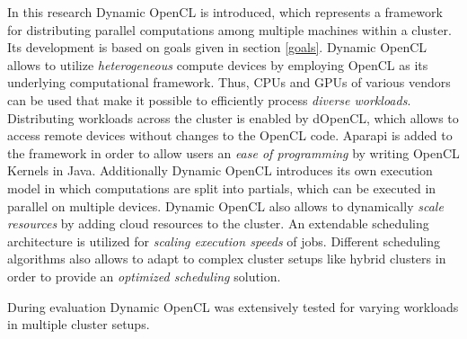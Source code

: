 In this research Dynamic OpenCL is introduced, which represents a framework for distributing parallel computations among multiple machines within a cluster. Its development is based on goals given in section \ref{goals}. Dynamic OpenCL allows to utilize \textit{heterogeneous} compute devices by employing OpenCL as its underlying computational framework. Thus, CPUs and GPUs of various vendors can be used that make it possible to efficiently process \textit{diverse workloads}. Distributing workloads across the cluster is enabled by dOpenCL, which allows to access remote devices without changes to the OpenCL code. Aparapi is added to the framework in order to allow users an \textit{ease of programming} by writing OpenCL Kernels in Java. Additionally Dynamic OpenCL introduces its own execution model in which computations are split into partials, which can be executed in parallel on multiple devices. Dynamic OpenCL also allows to dynamically \textit{scale resources} by adding cloud resources to the cluster. An extendable scheduling architecture is utilized for \textit{scaling execution speeds} of jobs. Different scheduling algorithms also allows to adapt to complex cluster setups like hybrid clusters in order to provide an \textit{optimized scheduling} solution.

During evaluation Dynamic OpenCL was extensively tested for varying workloads in multiple cluster setups. 